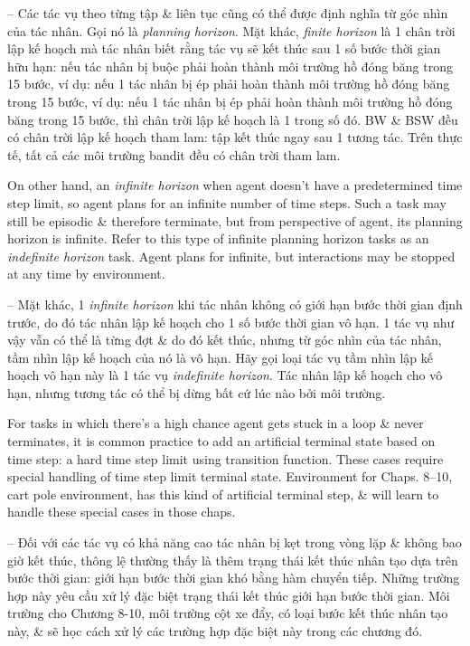 \documentclass{article}
\begin{document}
\begin{itemize}
\begin{itemize}
        -- Các tác vụ theo từng tập \& liên tục cũng có thể được định nghĩa từ góc nhìn của tác nhân. Gọi nó là {\it planning horizon}. Mặt khác, {\it finite horizon} là 1 chân trời lập kế hoạch mà tác nhân biết rằng tác vụ sẽ kết thúc sau 1 số bước thời gian hữu hạn: nếu tác nhân bị buộc phải hoàn thành môi trường hồ đóng băng trong 15 bước, ví dụ: nếu 1 tác nhân bị ép phải hoàn thành môi trường hồ đóng băng trong 15 bước, ví dụ: nếu 1 tác nhân bị ép phải hoàn thành môi trường hồ đóng băng trong 15 bước, thì chân trời lập kế hoạch là 1 trong số đó. BW \& BSW đều có chân trời lập kế hoạch tham lam: tập kết thúc ngay sau 1 tương tác. Trên thực tế, tất cả các môi trường bandit đều có chân trời tham lam.

        On other hand, an {\it infinite horizon} when agent doesn't have a predetermined time step limit, so agent plans for an infinite number of time steps. Such a task may still be episodic \& therefore terminate, but from perspective of agent, its planning horizon is infinite. Refer to this type of infinite planning horizon tasks as an {\it indefinite horizon} task. Agent plans for infinite, but interactions may be stopped at any time by environment.

        -- Mặt khác, 1 {\it infinite horizon} khi tác nhân không có giới hạn bước thời gian định trước, do đó tác nhân lập kế hoạch cho 1 số bước thời gian vô hạn. 1 tác vụ như vậy vẫn có thể là từng đợt \& do đó kết thúc, nhưng từ góc nhìn của tác nhân, tầm nhìn lập kế hoạch của nó là vô hạn. Hãy gọi loại tác vụ tầm nhìn lập kế hoạch vô hạn này là 1 tác vụ {\it indefinite horizon}. Tác nhân lập kế hoạch cho vô hạn, nhưng tương tác có thể bị dừng bất cứ lúc nào bởi môi trường.

        For tasks in which there's a high chance agent gets stuck in a loop \& never terminates, it is common practice to add an artificial terminal state based on time step: a hard time step limit using transition function. These cases require special handling of time step limit terminal state. Environment for Chaps. 8--10, cart pole environment, has this kind of artificial terminal step, \& will learn to handle these special cases in those chaps.

        -- Đối với các tác vụ có khả năng cao tác nhân bị kẹt trong vòng lặp \& không bao giờ kết thúc, thông lệ thường thấy là thêm trạng thái kết thúc nhân tạo dựa trên bước thời gian: giới hạn bước thời gian khó bằng hàm chuyển tiếp. Những trường hợp này yêu cầu xử lý đặc biệt trạng thái kết thúc giới hạn bước thời gian. Môi trường cho Chương 8-10, môi trường cột xe đẩy, có loại bước kết thúc nhân tạo này, \& sẽ học cách xử lý các trường hợp đặc biệt này trong các chương đó.


\end{itemize}
\end{itemize}
\end{document}
